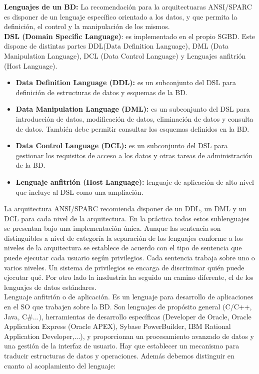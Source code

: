 \documentclass[a4paper,11pt]{article}
\begin{document}
\textbf{Lenguajes de un BD:} La recomendación para la arquitectuaras ANSI/SPARC es disponer de un lenguaje específico orientado a los datos, y que permita la definición, el control y la manipulación de los mismos. \\

\textbf{DSL (Domain Specific Language)}: es implementado en el propio SGBD. Este dispone de distintas partes DDL(Data Definition Language), DML (Data Manipulation Language), DCL (Data Control Language) y Lenguajes anfitrión (Host Language).

\begin{itemize}
\item \textbf{Data Definition Language (DDL):} es un subconjunto del DSL para definición de estructuras de datos y esquemas de la BD.

\item \textbf{Data Manipulation Language (DML):} es un subconjunto del DSL para introducción de datos, modificación de datos, eliminación de datos y consulta de datos. También debe permitir consultar los esquemas definidos en la BD.

\item \textbf{Data Control Language (DCL):} es un subconjunto del DSL para gestionar los requisitos de acceso a los datos y otras tareas de administración de la BD.

\item \textbf{Lenguaje anfitrión (Host Language):} lenguaje de aplicación de alto nivel que incluye al DSL como una ampliación.
\end{itemize}

La arquitectura ANSI/SPARC recomienda disponer de un DDL, un DML y un DCL para cada nivel de la arquitectura. En la práctica todos estos sublenguajes se presentan bajo una implementación única. Aunque las sentencia son distinguibles a nivel de categoría la separación de los lenguajes conforme a los niveles de la arquitectura se establece de acuerdo con el tipo de sentencia que puede ejecutar cada usuario según privilegios. Cada sentencia trabaja sobre uno o varios niveles. Un sistema de privilegios se encarga de discriminar quién puede ejecutar qué. Por otro lado la insdustria ha seguido un camino diferente, el de los lenguajes de datos estándares. \\

Lenguaje anfitrión o de aplicación. Es un lenguaje para desarrollo de aplicaciones en el SO que trabajen sobre la BD. Son lenguajes de propósito general (C/C++, Java, C\#...), herramientas de desarrollo específicas (Developer de Oracle, Oracle Application Express (Oracle APEX), Sybase PowerBuilder, IBM Rational Application Developer,...), y proporcionan un procesamiento avanzado de datos y una gestión de la interfaz de usuario. Hay que establecer un mecanismo para traducir estructuras de datos y operaciones. Además debemos distinguir en cuanto al acoplamiento del lenguaje:
\end{document}
